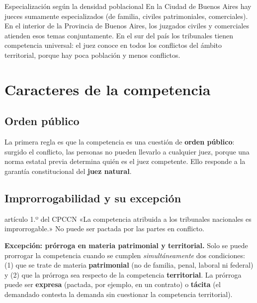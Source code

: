\documentclass[12pt,oneside]{book}
\begin{document}
\begin{ejemplo}{Especialización según la densidad poblacional}
En la Ciudad de Buenos Aires hay jueces sumamente especializados (de familia, civiles patrimoniales, comerciales). En el interior de la Provincia de Buenos Aires, los juzgados civiles y comerciales atienden esos temas conjuntamente. En el sur del país los tribunales tienen competencia universal: el juez conoce en todos los conflictos del ámbito territorial, porque hay poca población y menos conflictos.
\end{ejemplo}

\section{Caracteres de la competencia}

\subsection{Orden público}

La primera regla es que la competencia es una cuestión de \textbf{orden público}: surgido el conflicto, las personas no pueden llevarlo a cualquier juez, porque una norma estatal previa determina quién es el juez competente. Ello responde a la garantía constitucional del \textbf{juez natural}.

\subsection{Improrrogabilidad y su excepción}

\begin{regla}{artículo 1.º del CPCCN}
«La competencia atribuida a los tribunales nacionales es improrrogable.» No puede ser pactada por las partes en conflicto.
\end{regla}

\begin{importante}
\textbf{Excepción: prórroga en materia patrimonial y territorial.} Solo se puede prorrogar la competencia cuando se cumplen \emph{simultáneamente} dos condiciones: (1) que se trate de materia \textbf{patrimonial} (no de familia, penal, laboral ni federal) y (2) que la prórroga sea respecto de la competencia \textbf{territorial}. La prórroga puede ser \textbf{expresa} (pactada, por ejemplo, en un contrato) o \textbf{tácita} (el demandado contesta la demanda sin cuestionar la competencia territorial).
\end{importante}
\end{document}
